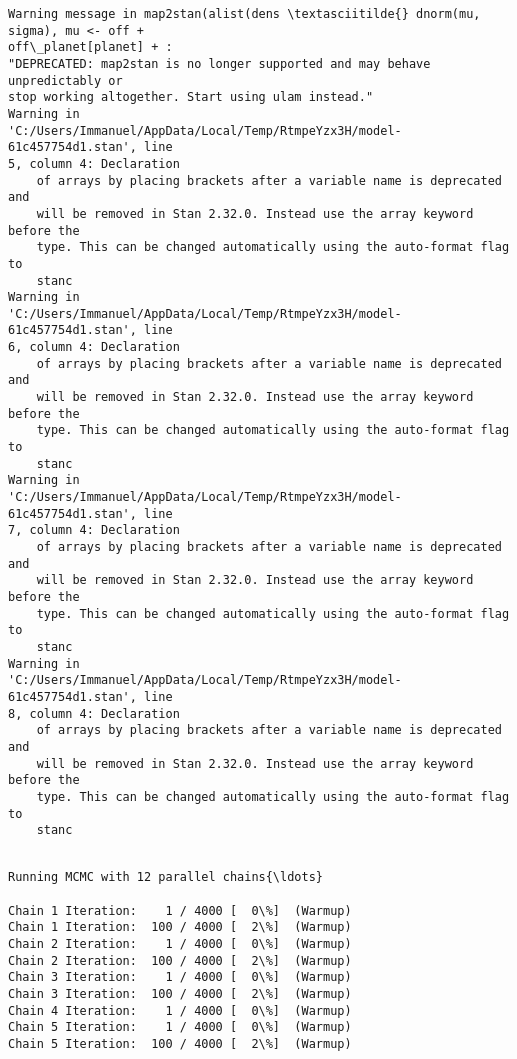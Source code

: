 \documentclass[11pt]{article}
\begin{document}
    \begin{Verbatim}[commandchars=\\\{\}]
Warning message in map2stan(alist(dens \textasciitilde{} dnorm(mu, sigma), mu <- off +
off\_planet[planet] + :
"DEPRECATED: map2stan is no longer supported and may behave unpredictably or
stop working altogether. Start using ulam instead."
Warning in
'C:/Users/Immanuel/AppData/Local/Temp/RtmpeYzx3H/model-61c457754d1.stan', line
5, column 4: Declaration
    of arrays by placing brackets after a variable name is deprecated and
    will be removed in Stan 2.32.0. Instead use the array keyword before the
    type. This can be changed automatically using the auto-format flag to
    stanc
Warning in
'C:/Users/Immanuel/AppData/Local/Temp/RtmpeYzx3H/model-61c457754d1.stan', line
6, column 4: Declaration
    of arrays by placing brackets after a variable name is deprecated and
    will be removed in Stan 2.32.0. Instead use the array keyword before the
    type. This can be changed automatically using the auto-format flag to
    stanc
Warning in
'C:/Users/Immanuel/AppData/Local/Temp/RtmpeYzx3H/model-61c457754d1.stan', line
7, column 4: Declaration
    of arrays by placing brackets after a variable name is deprecated and
    will be removed in Stan 2.32.0. Instead use the array keyword before the
    type. This can be changed automatically using the auto-format flag to
    stanc
Warning in
'C:/Users/Immanuel/AppData/Local/Temp/RtmpeYzx3H/model-61c457754d1.stan', line
8, column 4: Declaration
    of arrays by placing brackets after a variable name is deprecated and
    will be removed in Stan 2.32.0. Instead use the array keyword before the
    type. This can be changed automatically using the auto-format flag to
    stanc


    \end{Verbatim}

    \begin{Verbatim}[commandchars=\\\{\}]
Running MCMC with 12 parallel chains{\ldots}

Chain 1 Iteration:    1 / 4000 [  0\%]  (Warmup)
Chain 1 Iteration:  100 / 4000 [  2\%]  (Warmup)
Chain 2 Iteration:    1 / 4000 [  0\%]  (Warmup)
Chain 2 Iteration:  100 / 4000 [  2\%]  (Warmup)
Chain 3 Iteration:    1 / 4000 [  0\%]  (Warmup)
Chain 3 Iteration:  100 / 4000 [  2\%]  (Warmup)
Chain 4 Iteration:    1 / 4000 [  0\%]  (Warmup)
Chain 5 Iteration:    1 / 4000 [  0\%]  (Warmup)
Chain 5 Iteration:  100 / 4000 [  2\%]  (Warmup)
    \end{Verbatim}
\end{document}
